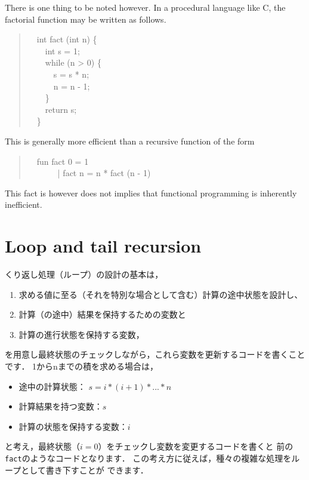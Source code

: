 \documentclass{jbook}
\newif\ifjp
\newcommand{\txt}[2]{#2}
\newcommand{\myem}{\mbox{\ \ }}
\newenvironment{program}{\begin{quote}\begin{tt}}%
                        {\end{tt}\end{quote}}
\begin{document}
	There is one thing to be noted however.
	In a procedural language like C, the factorial function may be
written as follows.
\begin{program}
\myem int fact (int n) \{\\
\myem\myem   int s = 1;\\
\myem\myem   while (n > 0) \{\\
\myem\myem\myem     s = s * n;\\
\myem\myem\myem     n = n - 1;\\
\myem\myem   \}\\
\myem\myem  return s;\\
\myem \}
\end{program}
	This is generally more efficient than a recursive function of
the form
\begin{program}
\myem fun fact 0 = 1\\
\myem \ \ \ \ \ | fact n = n * fact (n - 1)
\end{program}
	This fact is however does not implies that functional
programming is inherently inefficient.
\fi%

\section{\txt{ループと末尾再帰関数}{Loop and tail recursion}}
\label{sec:tutorialTailcall}

\ifjp%
	くり返し処理（ループ）の設計の基本は，
\begin{enumerate}
\item 
求める値に至る（それを特別な場合として含む）計算の途中状態を設計し、
\item 
計算（の途中）結果を保持するための変数と
\item 
計算の進行状態を保持する変数，
\end{enumerate}
を用意し最終状態のチェックしながら，これら変数を更新するコードを書くこと
です．
	1からnまでの積を求める場合は，
\begin{itemize}
\item 
途中の計算状態：
$s = i * (i + 1) * ... * n$
\item 
計算結果を持つ変数：$s$
\item 
計算の状態を保持する変数：$i$
\end{itemize}
と考え，最終状態（$i = 0$）をチェックし変数を変更するコードを書くと
前の{\tt fact}のようなコードとなります．
	この考え方に従えば，種々の複雑な処理をループとして書き下すことが
できます．
\end{document}
